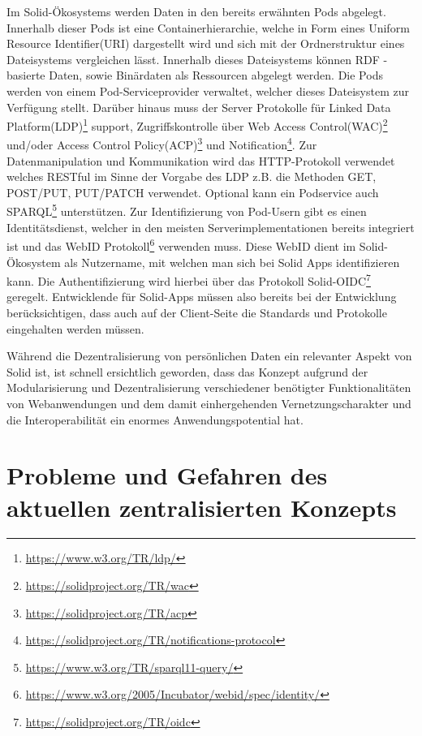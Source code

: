 \documentclass[acmtog]{acmart}
\begin{document}
Im Solid-Ökosystems werden Daten in den bereits erwähnten Pods abgelegt. Innerhalb dieser Pods ist eine Containerhierarchie, welche in Form eines Uniform Resource Identifier(URI) dargestellt wird und sich mit der Ordnerstruktur eines Dateisystems vergleichen lässt. Innerhalb dieses Dateisystems können RDF - basierte Daten, sowie Binärdaten als Ressourcen abgelegt werden. Die Pods werden von einem Pod-Serviceprovider verwaltet, welcher dieses Dateisystem zur Verfügung stellt. Darüber hinaus muss der Server Protokolle für Linked Data Platform(LDP)\footnote{\url{https://www.w3.org/TR/ldp/}} support, Zugriffskontrolle über Web Access Control(WAC)\footnote{\url{https://solidproject.org/TR/wac}} und/oder Access Control Policy(ACP)\footnote{\url{https://solidproject.org/TR/acp}} und Notification\footnote{\url{https://solidproject.org/TR/notifications-protocol}}. Zur Datenmanipulation und Kommunikation wird das HTTP-Protokoll verwendet welches RESTful im Sinne der Vorgabe des LDP z.B. die Methoden GET, POST/PUT, PUT/PATCH verwendet. Optional kann ein Podservice auch SPARQL\footnote{\url{https://www.w3.org/TR/sparql11-query/}} unterstützen.
Zur Identifizierung von Pod-Usern gibt es einen Identitätsdienst, welcher in den meisten Serverimplementationen bereits integriert ist und das WebID Protokoll\footnote{\url{https://www.w3.org/2005/Incubator/webid/spec/identity/}} verwenden muss. Diese WebID dient im Solid-Ökosystem als Nutzername, mit welchen man sich bei Solid Apps identifizieren kann. Die Authentifizierung wird hierbei über das Protokoll Solid-OIDC\footnote{\url{https://solidproject.org/TR/oidc}} geregelt.
Entwicklende für Solid-Apps müssen also bereits bei der Entwicklung berücksichtigen, dass auch auf der Client-Seite die Standards und Protokolle eingehalten werden müssen.~\cite{sambra2016solid}

Während die Dezentralisierung von persönlichen Daten ein relevanter Aspekt von Solid ist, ist schnell ersichtlich geworden, dass das Konzept aufgrund der Modularisierung und Dezentralisierung verschiedener benötigter Funktionalitäten von Webanwendungen und dem damit einhergehenden Vernetzungscharakter und die Interoperabilität ein enormes Anwendungspotential hat.

\section{Probleme und Gefahren des aktuellen zentralisierten Konzepts} \label{section:problemeUndGefahrenDesAktuellenZentralisiertenKonzepts}
\end{document}
